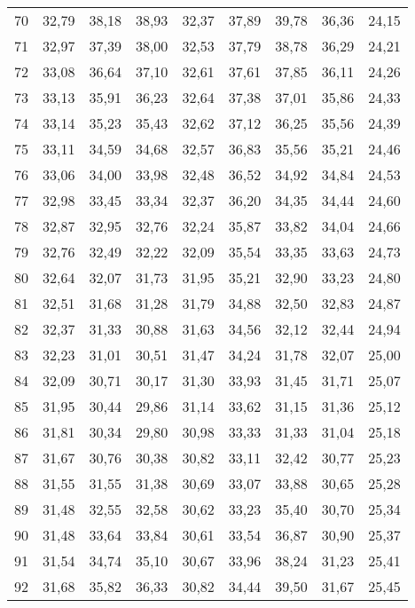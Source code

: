 \begin{longtable}{c c c c c c c c c}
      70	& 32,79	& 38,18	& 38,93	& 32,37	& 37,89	& 39,78	& 36,36	& 24,15 \\
      71	& 32,97	& 37,39	& 38,00	& 32,53	& 37,79	& 38,78	& 36,29	& 24,21 \\
      72	& 33,08	& 36,64	& 37,10	& 32,61	& 37,61	& 37,85	& 36,11	& 24,26 \\
      73	& 33,13	& 35,91	& 36,23	& 32,64	& 37,38	& 37,01	& 35,86	& 24,33 \\
      74	& 33,14	& 35,23	& 35,43	& 32,62	& 37,12	& 36,25	& 35,56	& 24,39 \\
      75	& 33,11	& 34,59	& 34,68	& 32,57	& 36,83	& 35,56	& 35,21	& 24,46 \\
      76	& 33,06	& 34,00	& 33,98	& 32,48	& 36,52	& 34,92	& 34,84	& 24,53 \\
      77	& 32,98	& 33,45	& 33,34	& 32,37	& 36,20	& 34,35	& 34,44	& 24,60 \\
      78	& 32,87	& 32,95	& 32,76	& 32,24	& 35,87	& 33,82	& 34,04	& 24,66 \\
      79	& 32,76	& 32,49	& 32,22	& 32,09	& 35,54	& 33,35	& 33,63	& 24,73 \\
      80	& 32,64	& 32,07	& 31,73	& 31,95	& 35,21	& 32,90	& 33,23	& 24,80 \\
      81	& 32,51	& 31,68	& 31,28	& 31,79	& 34,88	& 32,50	& 32,83	& 24,87 \\
      82	& 32,37	& 31,33	& 30,88	& 31,63	& 34,56	& 32,12	& 32,44	& 24,94 \\
      83	& 32,23	& 31,01	& 30,51	& 31,47	& 34,24	& 31,78	& 32,07	& 25,00 \\
      84	& 32,09	& 30,71	& 30,17	& 31,30	& 33,93	& 31,45	& 31,71	& 25,07 \\
      85	& 31,95	& 30,44	& 29,86	& 31,14	& 33,62	& 31,15	& 31,36	& 25,12 \\
      86	& 31,81	& 30,34	& 29,80	& 30,98	& 33,33	& 31,33	& 31,04	& 25,18 \\
      87	& 31,67	& 30,76	& 30,38	& 30,82	& 33,11	& 32,42	& 30,77	& 25,23 \\
      88	& 31,55	& 31,55	& 31,38	& 30,69	& 33,07	& 33,88	& 30,65	& 25,28 \\
      89	& 31,48	& 32,55	& 32,58	& 30,62	& 33,23	& 35,40	& 30,70	& 25,34 \\
      90	& 31,48	& 33,64	& 33,84	& 30,61	& 33,54	& 36,87	& 30,90	& 25,37 \\
      91	& 31,54	& 34,74	& 35,10	& 30,67	& 33,96	& 38,24	& 31,23	& 25,41 \\
      92	& 31,68	& 35,82	& 36,33	& 30,82	& 34,44	& 39,50	& 31,67	& 25,45 \\

\end{longtable}
